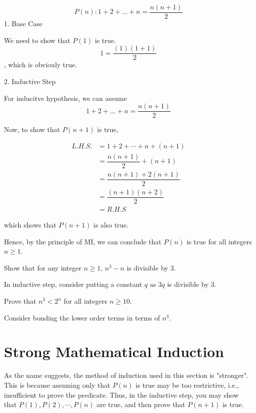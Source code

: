 \begin{eg}
  \[
    P(n): 1 + 2 + \dots + n = \dfrac{n(n+1)}{2}
  \] 
  1. Base Case

  We need to show that \(P(1)\) is true. 
  \[
    1 = \dfrac{(1)(1+1)}{2}
  \] 
  , which is obviouly true.
  
  2. Inductive Step

  For inducitve hypothesis, we can assume \[1 + 2 + \dots + n = \dfrac{n(n+1)}{2}\]

  Now, to show that \(P(n+1)\) is true, 

  \[
  \begin{aligned}
    L.H.S. &= 1 + 2 + \cdots + n + (n+1)\\
    &= \dfrac{n(n+1)}{2} + (n+1) \\
    &= \dfrac{n(n+1) + 2(n+1)}{2} \\
    &= \dfrac{(n+1)(n+2)}{2} \\
    &= R.H.S
  \end{aligned}
  \]

  which shows that \(P(n+1)\) is also true.

  Hence, by the principle of MI, we can conclude that \(P(n)\) is true for all integers \(n \geq 1\).
\end{eg}

\begin{exercise}
  Show that for any integer \(n \geq 1\), \(n^3 - n\) is divisible by 3.
  \begin{note}
    In inductive step, consider putting a constant \(q\) as \(3q\) is divisible by 3.
  \end{note}
\end{exercise}

\begin{exercise}
  Prove that \(n^3 < 2^n\) for all integers \(n \geq 10\).  
  \begin{note}
    Consider bonding the lower order terms in terms of \(n^3\).
  \end{note}
\end{exercise}

\section{Strong Mathematical Induction}
As the name suggests, the method of induction used in this section is "stronger". This is because assuming only that \(P(n)\) is true may be too restrictive, i.e., insufficient to prove the predicate. Thus, in the inductive step, you may show that \(P(1), P(2), \cdots, P(n)\) are true, and then prove that \(P(n+1)\) is true.

